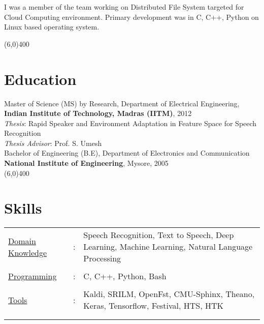 \documentclass[line,margin]{res}
\begin{document}
\begin{resume}
\small
I was a member of the team working on Distributed File System targeted for Cloud Computing environment. Primary development was in C, C++, Python on Linux based operating system. 
 
\normalsize
\vspace{-5mm}
\line(6,0){400}



\section{Education} 
\small
Master of Science (MS) by Research, Department of Electrical Engineering, \\{\bf Indian Institute of Technology, Madras (IITM)}, 2012  \\
\emph{Thesis}: Rapid Speaker and Environment Adaptation in Feature Space for Speech Recognition \\
\emph{Thesis Advisor}: Prof. S. Umesh \\

Bachelor of Engineering (B.E), Department of Electronics and Communication \\ {\bf National Institute of Engineering}, Mysore, 2005 \\

\line(6,0){400}

\section{Skills}
\small
   \begin{tabular}{l c p{3in}}\vspace{-4mm}
   \hspace{-3mm} \underline{Domain Knowledge} & :&   Speech Recognition, Text to Speech, Deep Learning, Machine Learning, Natural Language Processing \\ \\ \vspace{-4mm}
   \hspace{-3mm} \underline{Programming} & :&   C, C++, Python, Bash \\ \\ \vspace{-4mm}
   \hspace{-3mm} \underline{Tools} & :&   Kaldi, SRILM, OpenFst, CMU-Sphinx, Theano, Keras, Tensorflow, Festival, HTS, HTK \\ \\ \vspace{-4mm}
 \end{tabular}
\normalsize
\\



\end{resume}
\end{document}
